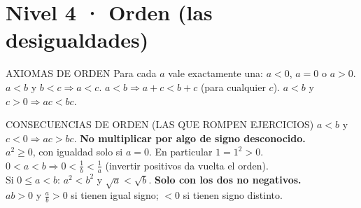\section*{Nivel 4 · Orden (las desigualdades)}
\begin{sello}{AXIOMAS DE ORDEN}
 Para cada $a$ vale exactamente una: $a<0$, $a=0$ o $a>0$.
 $a<b$ y $b<c\Rightarrow a<c$.
 $a<b\Rightarrow a+c<b+c$ (para cualquier $c$).
 $a<b$ y $c>0\Rightarrow ac<bc$.
\end{sello}
\begin{memo}{CONSECUENCIAS DE ORDEN (LAS QUE ROMPEN EJERCICIOS)}
 $a<b$ y $c<0\Rightarrow ac>bc$. \textbf{No multiplicar por algo de signo desconocido.}\\
 $a^2\ge0$, con igualdad solo si $a=0$. En particular $1=1^2>0$.\\
 $0<a<b\Rightarrow 0<\frac1b<\frac1a$ (invertir positivos da vuelta el orden).\\
 Si $0\le a<b$: $a^2<b^2$ y $\sqrt a<\sqrt b$. \textbf{Solo con los dos no negativos.}\\
 $ab>0$ y $\frac ab>0$ si tienen igual signo; $<0$ si tienen signo distinto.
\end{memo}

